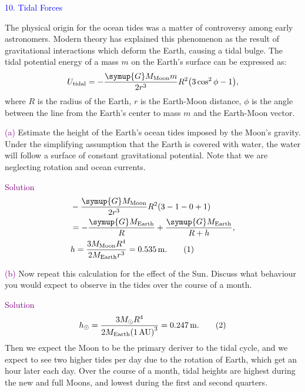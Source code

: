 \documentclass[UTF8, 12pt, a4paper, oneside, twocolumn, fontset=none]{ctexart}
\begin{document}
\hspace*{\fill}

\noindent\textcolor{blue}{10. Tidal Forces}

\noindent The physical origin for the ocean tides was a matter of controversy among early astronomers. Modern theory has explained this phenomenon as the result of gravitational interactions which deform the Earth, causing a tidal bulge. The tidal potential energy of a mass $m$ on the Earth's surface can be expressed as:
\begin{equation}
U_{\mathrm{tidal}}=-\dfrac{\symup{G}M_{\mathrm{Moon}}m}{2r^{3}}R^{2}\mleft(3\cos^{2}{\phi}-1\mright),\notag
\end{equation}
where $R$ is the radius of the Earth, $r$ is the Earth-Moon distance, $\phi$ is the angle between the line from the Earth's center to mass $m$ and the Earth-Moon vector.

\hspace*{\fill}

\noindent\textcolor{purple}{(a)} Estimate the height of the Earth's ocean tides imposed by the Moon's gravity. Under the simplifying assumption that the Earth is covered with water, the water will follow a surface of constant gravitational potential. Note that we are neglecting rotation and ocean currents.

\hspace*{\fill}

\noindent\textcolor{purple}{Solution}
\begin{align}
&-\frac{\symup{G}M_{\mathrm{Moon}}}{2r^{3}}R^{2}\mleft(3-1-0+1\mright)\notag\\
&=-\frac{\symup{G}M_{\mathrm{Earth}}}{R}+\frac{\symup{G}M_{\mathrm{Earth}}}{R+h},\notag\\
&h=\frac{3M_{\mathrm{Moon}}R^{4}}{2M_{\mathrm{Earth}}r^{3}}=\qty{0.535}{m}.\tag{1}
\end{align}

\hspace*{\fill}

\noindent\textcolor{purple}{(b)} Now repeat this calculation for the effect of the Sun. Discuss what behaviour you would expect to observe in the tides over the course of a month.

\hspace*{\fill}

\noindent\textcolor{purple}{Solution}
\begin{equation}
h_{\odot}=\frac{3M_{\odot}R^{4}}{2M_{\mathrm{Earth}}\mleft(\qty{1}{AU}\mright)^{3}}=\qty{0.247}{m}.\tag{2}
\end{equation}
Then we expect the Moon to be the primary deriver to the tidal cycle, and we expect to see two higher tides per day due to the rotation of Earth, which get an hour later each day. Over the course of a month, tidal heights are highest during the new and full Moons, and lowest during the first and second quarters.
\end{document}
